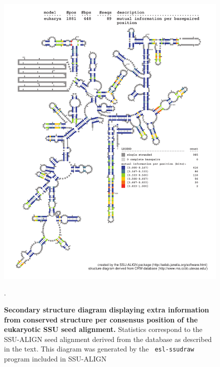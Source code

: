 \begin{figure}
\begin{center}
\includegraphics[width=5.7in]{Figures/eukarya-0p1-mutinfo}
\end{center}
\caption[Secondary structure diagram displaying extra information 
  from conserved structure per consensus position of the eukaryotic SSU seed
  alignment]{\textbf{Secondary structure diagram displaying extra
  information from conserved structure per consensus position of the eukaryotic SSU seed
  alignment.} Statistics correspond to the SSU-ALIGN seed
  alignment derived from the  database \cite{CannoneGutell02}
  as described in the text. This diagram was generated by the {\tt
  esl-ssudraw} program included in SSU-ALIGN}.
\label{fig:euksinfo}
\end{figure}


